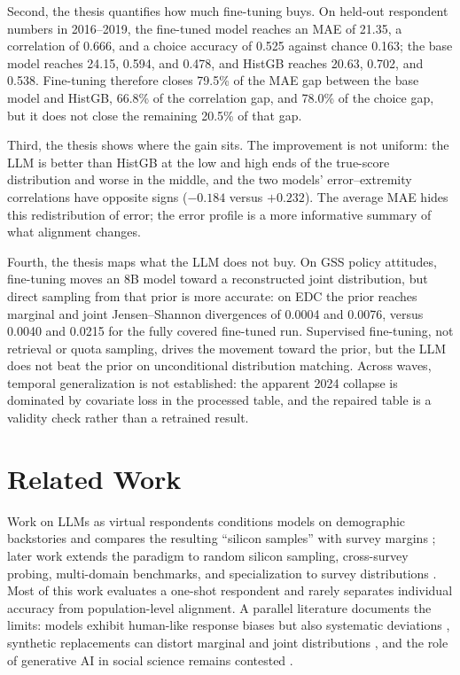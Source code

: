 Second, the thesis quantifies how much fine-tuning buys. On held-out respondent
numbers in 2016--2019, the fine-tuned model reaches an MAE of 21.35, a
correlation of 0.666, and a choice accuracy of 0.525 against chance 0.163; the
base model reaches 24.15, 0.594, and 0.478, and HistGB reaches 20.63, 0.702, and
0.538. Fine-tuning therefore closes 79.5\% of the MAE gap between the base model
and HistGB, 66.8\% of the correlation gap, and 78.0\% of the choice gap, but it
does not close the remaining 20.5\% of that gap.

Third, the thesis shows where the gain sits. The improvement is not uniform: the
LLM is better than HistGB at the low and high ends of the true-score
distribution and worse in the middle, and the two models' error--extremity
correlations have opposite signs ($-0.184$ versus $+0.232$). The average MAE hides
this redistribution of error; the error profile is a more informative summary of
what alignment changes.

Fourth, the thesis maps what the LLM does not buy. On GSS policy attitudes,
fine-tuning moves an 8B model toward a reconstructed joint distribution, but
direct sampling from that prior is more accurate: on EDC the prior reaches
marginal and joint Jensen--Shannon divergences of 0.0004 and 0.0076, versus
0.0040 and 0.0215 for the fully covered fine-tuned run. Supervised fine-tuning,
not retrieval or quota sampling, drives the movement toward the prior, but the
LLM does not beat the prior on unconditional distribution matching. Across
waves, temporal generalization is not established: the apparent 2024 collapse
is dominated by covariate loss in the processed table, and the repaired table is
a validity check rather than a retrained result.

\section{Related Work}

Work on LLMs as virtual respondents conditions models on demographic backstories
and compares the resulting ``silicon samples'' with survey margins
\citep{argyle2023,aher2023multiple,santurkar2023,dillion2023,kim2023}; later work extends the
paradigm to random silicon sampling, cross-survey probing, multi-domain
benchmarks, and specialization to survey distributions
\citep{sun2024,zhou2024,zhao2025,cao2025}. Most of this work evaluates a one-shot
respondent and rarely separates individual accuracy from population-level
alignment. A parallel literature documents the limits: models exhibit human-like
response biases but also systematic deviations \citep{tjuatja2023}, synthetic
replacements can distort marginal and joint distributions \citep{bisbee2024},
and the role of generative AI in social science remains contested
\citep{grossmann2023,bail2024,ziems2024,ma2024,mou2024,anthis2025}.

